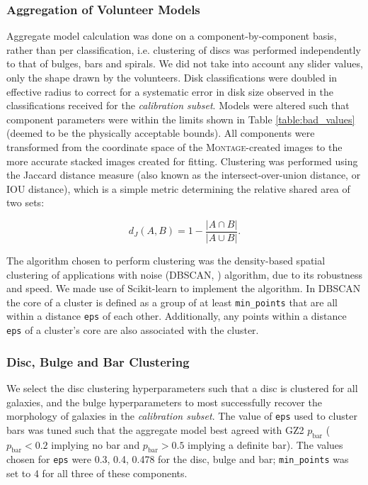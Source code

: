 \documentclass[../main.tex]{subfiles}
\begin{document}
\subsubsection{Aggregation of Volunteer Models}
\label{sec:aggregation_of_volunteer_models}

Aggregate model calculation was done on a component-by-component basis, rather than per classification, i.e. clustering of discs was performed independently to that of bulges, bars and spirals. We did not take into account any slider values, only the shape drawn by the volunteers. Disk classifications were doubled in effective radius to correct for a systematic error in disk size observed in the classifications received for the \textit{calibration subset}. Models were altered such that component parameters were within the limits shown in Table \ref{table:bad_values} (deemed to be the physically acceptable bounds). All components were transformed from the coordinate space of the \textsc{Montage}-created images to the more accurate stacked images created for fitting. Clustering was performed using the Jaccard distance measure (also known as the intersect-over-union distance, or IOU distance), which is a simple metric determining the relative shared area of two sets:

\begin{equation}
d_J(A, B) = 1 - \frac{|A \cap B|}{|A \cup B|}.
\end{equation}

The algorithm chosen to perform clustering was the density-based spatial clustering of applications with noise (DBSCAN, \citealt{dbscan}) algorithm, due to its robustness and speed. We made use of Scikit-learn \citep{scikit-learn} to implement the algorithm. In DBSCAN the core of a cluster is defined as a group of at least \texttt{min\_points} that are all within a distance \texttt{eps} of each other. Additionally, any points within a distance \texttt{eps} of a cluster's core are also associated with the cluster.

\subsubsection{Disc, Bulge and Bar Clustering}

We select the disc clustering hyperparameters such that a disc is clustered for all galaxies, and the bulge hyperparameters to most successfully recover the morphology of galaxies in the \textit{calibration subset}. The value of \texttt{eps} used to cluster bars was tuned such that the aggregate model best agreed with GZ2 $p_\mathrm{bar}$ ($p_\mathrm{bar} < 0.2$ implying no bar and $p_\mathrm{bar} > 0.5$ implying a definite bar). The values chosen for \texttt{eps} were 0.3, 0.4, 0.478 for the disc, bulge and bar; \texttt{min\_points} was set to 4 for all three of these components.
\end{document}
